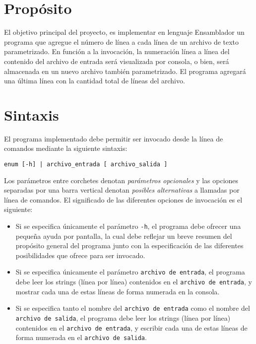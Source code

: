 \documentclass[12pt,a4paper]{article}
\begin{document}

\section*{Propósito}
El objetivo principal del proyecto, es implementar en lenguaje Ensamblador un programa que agregue el número de línea a cada línea de un archivo de texto parametrizado. En función a la invocación, la numeración línea a línea del contenido del archivo de entrada será visualizada por consola, o bien, será almacenada en un nuevo archivo también parametrizado. El programa agregará una última línea con la cantidad total de líneas del archivo.

\section*{Sintaxis}
El programa implementado debe permitir ser invocado desde la línea de comandos mediante la siguiente sintaxis:
\begin{center}
	\texttt{enum [-h] | archivo\_entrada [ archivo\_salida ]}
\end{center}

Los parámetros entre corchetes denotan \textit{parámetros opcionales} y las opciones separadas por una barra vertical denotan \textit{posibles alternativas} a llamadas por línea de comandos. El significado de las diferentes opciones de invocación es el siguiente:
\begin{itemize}
	\item Si se especifica únicamente el parámetro \texttt{-h}, el programa debe ofrecer una pequeña ayuda por pantalla, la cual debe reflejar un breve resumen del propósito general del programa junto con la especificación de las diferentes posibilidades que ofrece para ser invocado.
	\item Si se especifica únicamente el parámetro \texttt{archivo de entrada}, el programa debe leer los strings (línea por línea) contenidos en el \texttt{archivo de entrada}, y mostrar cada una de estas líneas de forma numerada en la consola. 
	\item Si se especifica tanto el nombre del \texttt{archivo de entrada} como el nombre del \texttt{archivo de salida}, el programa debe leer los strings (línea por línea) contenidos en el \texttt{archivo de entrada}, y escribir cada una de estas líneas de forma numerada en el \texttt{archivo de salida}.
\end{itemize}
	
\end{document}
